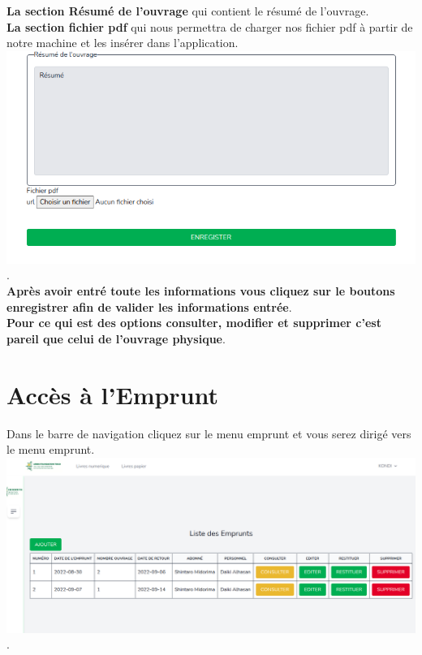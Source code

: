 \documentclass[12pt,a4paper]{article}
\begin{document}
\textbf{La section Résumé de l'ouvrage} qui contient le résumé de l'ouvrage.\\
\textbf{La section fichier pdf} qui nous permettra de charger nos fichier pdf à partir de notre machine et les insérer dans l'application.\\

\includegraphics[scale=0.5]{images/ResumeFichier.png}.\\

\textbf{Après avoir entré toute les informations vous cliquez sur le boutons enregistrer afin de valider les informations entrée}.\\

\textbf{Pour ce qui est des options consulter, modifier et supprimer c'est pareil que celui de l'ouvrage physique}.\\

\newpage
\section{Accès à l'Emprunt}
Dans le barre de navigation cliquez sur le menu emprunt et vous serez dirigé vers le menu emprunt.\\

\includegraphics[scale=0.35]{images/Emprunt.png}.\\
\end{document}
